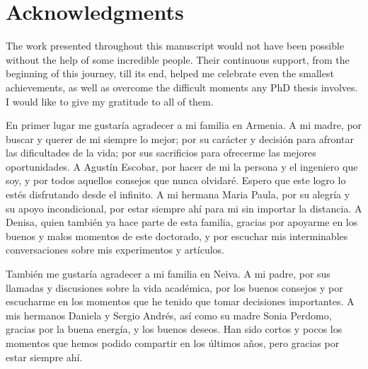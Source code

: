 



\bigskip

\begingroup
\let\clearpage\relax
\let\cleardoublepage\relax
\let\cleardoublepage\relax
\chapter*{Acknowledgments}

The work presented throughout this manuscript would not have been possible
without the help of some incredible people. Their continuous support, from the
beginning of this journey, till its end, helped me celebrate even the smallest
achievements, as well as overcome the difficult moments any PhD thesis involves.
I would like to give my gratitude to all of them.

En primer lugar me gustaría agradecer a mi familia en Armenia. A mi madre, por
buscar y querer de mi siempre lo mejor; por su carácter y decisión para afrontar
las dificultades de la vida; por sus sacrificios para ofrecerme las mejores
oportunidades. A Agustín Escobar, por hacer de mi la persona y el ingeniero que
soy, y por todos aquellos consejos que nunca olvidaré. Espero que este logro lo
estés disfrutando desde el infinito. A mi hermana Maria Paula, por su alegría y
su apoyo incondicional, por estar siempre ahí para mi sin importar la distancia.
A Denisa, quien también ya hace parte de esta familia, gracias por apoyarme en
los buenos y malos momentos de este doctorado, y por escuchar mis interminables
conversaciones sobre mis experimentos y artículos.

También me gustaría agradecer a mi familia en Neiva. A mi padre, por sus
llamadas y discusiones sobre la vida académica, por los buenos consejos y por
escucharme en los momentos que he tenido que tomar decisiones importantes. A mis
hermanos Daniela y Sergio Andrés, así como su madre Sonia Perdomo, gracias por
la buena energía, y los buenos deseos. Han sido cortos y pocos los momentos que
hemos podido compartir en los últimos años, pero gracias por estar siempre ahí.

